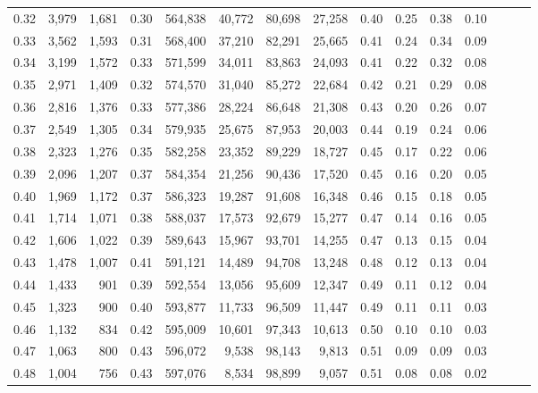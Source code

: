 \begin{tabular}{rrrrrrrrrrrrrrr}
0.32 &   3,979 &  1,681 &  0.30 &  564,838 &   40,772 &   80,698 &   27,258 &  0.40 &  0.25 &  0.38 &      0.10 \\
0.33 &   3,562 &  1,593 &  0.31 &  568,400 &   37,210 &   82,291 &   25,665 &  0.41 &  0.24 &  0.34 &      0.09 \\
0.34 &   3,199 &  1,572 &  0.33 &  571,599 &   34,011 &   83,863 &   24,093 &  0.41 &  0.22 &  0.32 &      0.08 \\
0.35 &   2,971 &  1,409 &  0.32 &  574,570 &   31,040 &   85,272 &   22,684 &  0.42 &  0.21 &  0.29 &      0.08 \\
0.36 &   2,816 &  1,376 &  0.33 &  577,386 &   28,224 &   86,648 &   21,308 &  0.43 &  0.20 &  0.26 &      0.07 \\
0.37 &   2,549 &  1,305 &  0.34 &  579,935 &   25,675 &   87,953 &   20,003 &  0.44 &  0.19 &  0.24 &      0.06 \\
0.38 &   2,323 &  1,276 &  0.35 &  582,258 &   23,352 &   89,229 &   18,727 &  0.45 &  0.17 &  0.22 &      0.06 \\
0.39 &   2,096 &  1,207 &  0.37 &  584,354 &   21,256 &   90,436 &   17,520 &  0.45 &  0.16 &  0.20 &      0.05 \\
0.40 &   1,969 &  1,172 &  0.37 &  586,323 &   19,287 &   91,608 &   16,348 &  0.46 &  0.15 &  0.18 &      0.05 \\
0.41 &   1,714 &  1,071 &  0.38 &  588,037 &   17,573 &   92,679 &   15,277 &  0.47 &  0.14 &  0.16 &      0.05 \\
0.42 &   1,606 &  1,022 &  0.39 &  589,643 &   15,967 &   93,701 &   14,255 &  0.47 &  0.13 &  0.15 &      0.04 \\
0.43 &   1,478 &  1,007 &  0.41 &  591,121 &   14,489 &   94,708 &   13,248 &  0.48 &  0.12 &  0.13 &      0.04 \\
0.44 &   1,433 &    901 &  0.39 &  592,554 &   13,056 &   95,609 &   12,347 &  0.49 &  0.11 &  0.12 &      0.04 \\
0.45 &   1,323 &    900 &  0.40 &  593,877 &   11,733 &   96,509 &   11,447 &  0.49 &  0.11 &  0.11 &      0.03 \\
0.46 &   1,132 &    834 &  0.42 &  595,009 &   10,601 &   97,343 &   10,613 &  0.50 &  0.10 &  0.10 &      0.03 \\
0.47 &   1,063 &    800 &  0.43 &  596,072 &    9,538 &   98,143 &    9,813 &  0.51 &  0.09 &  0.09 &      0.03 \\
0.48 &   1,004 &    756 &  0.43 &  597,076 &    8,534 &   98,899 &    9,057 &  0.51 &  0.08 &  0.08 &      0.02 \\

\end{tabular}
